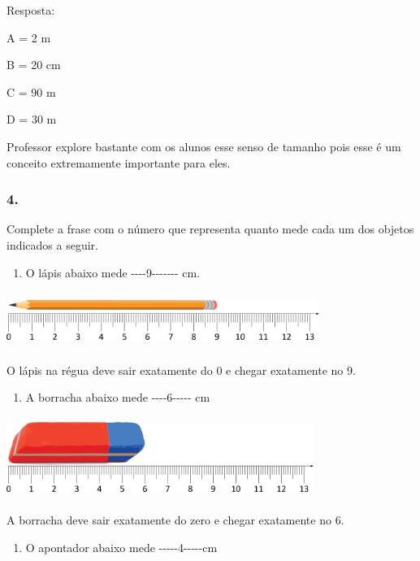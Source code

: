 Resposta:

A = 2 m

B = 20 cm

C = 90 m

D = 30 m

Professor explore bastante com os alunos esse senso de tamanho pois esse
é um conceito extremamente importante para eles.

\subsubsection{4. }\label{section-54}

Complete a frase com o número que representa quanto mede cada um dos
objetos indicados a seguir.

\begin{enumerate}
\def\labelenumi{\alph{enumi})}
\item
  O lápis abaixo mede -\/-\/-\/-9-\/-\/-\/-\/-\/-\/- cm.
\end{enumerate}

\includegraphics[width=4.00868in,height=0.70839in]{media/image42.png}

O lápis na régua deve sair exatamente do 0 e chegar exatamente no 9.

\begin{enumerate}
\def\labelenumi{\alph{enumi})}
\item
  A borracha abaixo mede -\/-\/-\/-6-\/-\/-\/-\/- cm
\end{enumerate}

\includegraphics[width=3.93367in,height=1.02509in]{media/image43.png}

A borracha deve sair exatamente do zero e chegar exatamente no 6.

\begin{enumerate}
\def\labelenumi{\alph{enumi})}
\item
  O apontador abaixo mede -\/-\/-\/-\/-4-\/-\/-\/-\/-cm
\end{enumerate}

